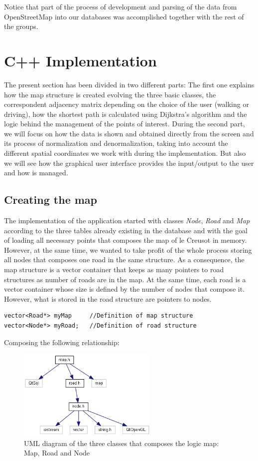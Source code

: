 \documentclass{article}
\begin{document}
Notice that part of the process of development and parsing of the data from OpenStreetMap into our databases was accomplished together with the rest of the groups.

\section{C++ Implementation}

The present section has been divided in two different parts: The first one explains how the map structure is created evolving the three basic classes, the correspondent adjacency matrix depending on the choice of the user (walking or driving), how the shortest path is calculated using Dijkstra's algorithm and the logic behind the management of the points of interest. During the second part, we will focus on how the data is shown and obtained directly from the screen and its process of normalization and denormalization, taking into account the different spatial coordinates we work with during the implementation. But also we will see how the graphical user interface provides the input/output to the user and how is managed.

\subsection{Creating the map}
The implementation of the application started with classes \textit{Node}, \textit{Road} and \textit{Map} according to the three tables already existing in the database and with the goal of loading all necessary points that composes the map of le Creusot in memory. However, at the same time, we wanted to take profit of the whole process storing all nodes that composes one road in the same structure. As a consequence, the map structure is a vector container that keeps as many pointers to road structures as number of roads are in the map. At the same time, each road is a vector container whose size is defined by the number of nodes that compose it. However, what is stored in the road structure are pointers to nodes.

\begin{lstlisting}
vector<Road*> myMap 	//Definition of map structure
vector<Node*> myRoad;	//Definition of road structure
\end{lstlisting}

Composing the following relationship:

\begin{figure}[h]
\centering
\includegraphics[width=0.6\textwidth]{map.png}
\caption{UML diagram of the three classes that composes the logic map: Map, Road and Node}
\end{figure}
\end{document}
